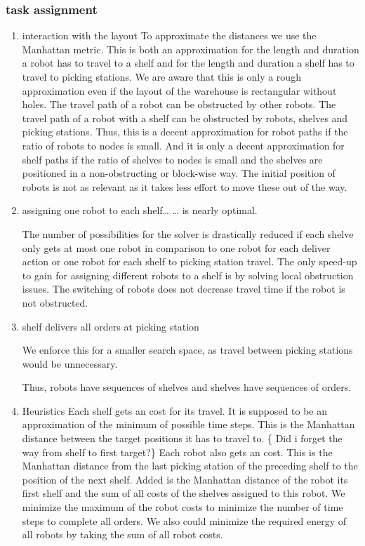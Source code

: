\documentclass[11pt]{article}
\begin{document}
\subsubsection{task assignment}
\label{sec:org58a47f9}
\begin{enumerate}
\item interaction with the layout
\label{sec:org0c0ecbe}
To approximate the distances we use the Manhattan metric.
This is both an approximation for the length and duration a robot has to travel to a shelf and for the length and duration a shelf has to travel to picking stations.
We are aware that this is only a rough approximation even if the layout of the warehouse is rectangular without holes.
The travel path of a robot can be obstructed by other robots.
The travel path of a robot with a shelf can be obstructed by robots, shelves and picking stations.
Thus, this is a decent approximation for robot paths if the ratio of robots to nodes is small.
And it is only a decent approximation for shelf paths if the ratio of shelves to nodes is small and the shelves are positioned in a non-obstructing or block-wise way.
The initial position of robots is not as relevant as it takes less effort to move these out of the way.
\item assigning one robot to each shelf\ldots{}
\label{sec:orgbeead52}
\ldots{} is nearly optimal.

     The number of possibilities for the solver is drastically reduced if each shelve only gets at most one robot in comparison to one robot for each deliver action or one robot for each shelf to picking station travel.
The only speed-up to gain for assigning different robots to a shelf is by solving local obstruction issues.
The switching of robots does not decrease travel time if the robot is not obstructed.
\item shelf delivers all orders at picking station
\label{sec:org6c59397}

We enforce this for a smaller search space, as travel between picking stations would be unnecessary.

Thus, robots have sequences of shelves and shelves have sequences of orders.
\item Heuristics
\label{sec:org47b6c01}
Each shelf gets an cost for its travel.
It is supposed to be an approximation of the minimum of possible time steps.
This is the Manhattan distance between the target positions it has to travel to.
\{\color{red} Did i forget the way from shelf to first target?\}
Each robot also gets an cost.
This is the Manhattan distance from the last picking station of the preceding shelf to the position of the next shelf.
Added is the Manhattan distance of the robot its first shelf and the sum of all costs of the shelves assigned to this robot.
We minimize the maximum of the robot costs to minimize the number of time steps to complete all orders.
We also could minimize the required energy of all robots by taking the sum of all robot costs.
\end{enumerate}
\end{document}
